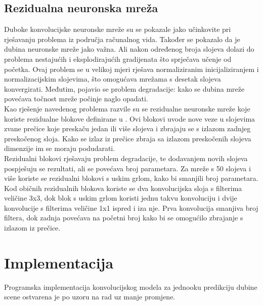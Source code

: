 \documentclass[times, utf8, zavrsni, numeric]{fer}
\begin{document}
\section{Rezidualna neuronska mreža}
Duboke konvolucijske neuronske mreže su se pokazale jako učinkovite pri
rješavanju problema iz područja računalnog vida. Također se pokazalo da je
dubina neuronske mreže jako važna. Ali nakon određenog broja slojeva
dolazi do problema nestajućih i eksplodirajućih gradijenata što sprječava 
učenje od početka. Ovaj problem se u velikoj mjeri rješava normaliziranim
inicijaliziranjem i normalizacijskim slojevima, što omogućava mrežama s
desetak slojeva konvergirati. Međutim, pojavio se problem degradacije: 
kako se dubina mreže povećava točnost mreže počinje naglo opadati.
\\\indent Kao rješenje navedenog problema razvile su se rezidualne
neuronske mreže koje koriste rezidualne blokove definirane u 
\cite{DBLP:journals/corr/HeZRS15}. Ovi blokovi uvode nove
veze u slojevima zvane prečice koje preskaču jedan ili više slojeva i zbrajaju
se s izlazom zadnjeg preskočenog sloja. Kako se izlaz iz prečice zbraja sa
izlazom preskočenih slojeva dimenzije im se moraju podudarati.
\\\indent Rezidualni blokovi rješavaju problem degradacije, te dodavanjem
novih slojeva pospješuju se rezultati, ali se povećava broj parametara.
Za mreže s 50 slojeva i više koriste se rezidualni blokovi s uskim grlom, kako 
bi smanjili broj parametara. Kod običnih rezidualnih blokova koriste se
dva konvolucijska sloja s filterima veličine 3x3, dok blok s uskim grlom
koristi jednu takvu konvoluciju i dvije konvolucije s filterima veličine 1x1
ispred i iza nje. Prva konvolucija smanjiva broj filtera, dok zadnja 
povećava na početni broj kako bi se omogućilo zbrajanje s izlazom iz prečice.

\chapter{Implementacija}
Programska implementacija konvolucijskog modela za jednooku predikciju dubine 
scene ostvarena je po uzoru na rad \citep{DBLP:journals/corr/LainaRBTN16} uz
manje promjene.
\end{document}
